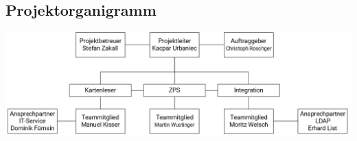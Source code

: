 \subsection{Projektorganigramm}
\vspace{2cm}
\begin{center}
    \includegraphics[width=1\textwidth]{images/Organigramm.png}
\end{center}
\vspace{2cm}

\newpage


